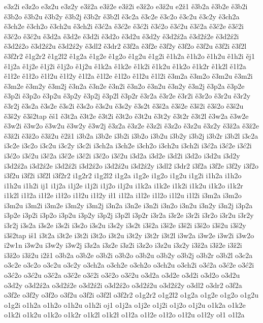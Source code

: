 {e3z2i
e3z2o
e3z2u
e3z2y
e3ž2a
e3ž2e
e3ž2i
e3ž2o
e3ž2u
e2ž1                       
ě3b2a 
ě3b2e 
ě3b2i 
ě3b2o
ě3b2u
ě3b2y
ě3b2j
ě3b2r
ě3b2l
ě3c2a
ě3c2e
ě3c2o
ě3c2u
ě3c2y
ě3ch2a
ě3ch2e
ě3ch2o
ě3ch2u
ě3ch2i
ě3ć2a
ě3ć2e
ě3ć2i
ě3ć2o
ě3ć2u
ě3č2a
ě3č2e
ě3č2i
ě3č2o
ě3č2u
ě3d2a
ě3d2e
ě3d2i
ě3d2o
ě3d2u
ě3d2y
ě3d2ź2a
ě3d2ź2e
ě3d2ź2i
ě3d2ź2o
ě3d2ź2u
ě3d2ź2y
ě3dl2
ě3dr2
ě3f2a
ě3f2e
ě3f2y
ě3f2o
ě3f2u
ě3f2i
ě3f2l
ě3f2r2
ě1g2r2
ě1g2l2
ě1g2a
ě1g2e
ě1g2o
ě1g2u
ě1g2i
ě1h2a
ě1h2o
ě1h2u
ě1h2i
ěj1
ě1j2a
ě1j2e
ě1j2i
ě1j2o
ě1j2u
ě1k2a
ě1k2e
ě1k2i
ě1k2u
ě1k2o
ě1k2r
ě1k2l
ě1ł2a
ě1ł2e
ě1ł2o
ě1ł2u
ě1ł2y
ě1l2a
ě1l2e
ě1l2o
ě1l2u
ě1l2i
ě3m2a
ě3m2o
ě3m2u
ě3m2i
ě3m2e
ě3m2y
ě3m2j
ě3n2a
ě3n2e
ě3n2i
ě3n2o
ě3n2u
ě3n2y
ě3n2j
ě3p2a
ě3p2e
ě3p2i
ě3p2o
ě3p2u
ě3p2y
ě3p2j
ě3p2l
ě3p2r
ě3r2a
ě3r2e
ě3r2i
ě3r2o
ě3r2u
ě3r2y
ě3r2j
ě3s2a
ě3s2e
ě3s2i
ě3s2o
ě3s2u
ě3s2y
ě3s2t
ě3š2a
ě3š2e
ě3š2i
ě3š2o
ě3š2u
ě3š2y
ě3š2tap
ěš1
ě3t2a
ě3t2e
ě3t2i
ě3t2o
ě3t2u
ě3t2y
ě3t2r
ě3t2l
ě3w2a
ě3w2e
ě3w2i
ě3w2o
ě3w2u
ě3w2y
ě3w2j
ě3z2a
ě3z2e
ě3z2i
ě3z2o
ě3z2u
ě3z2y
ě3ž2a
ě3ž2e
ě3ž2i
ě3ž2o
ě3ž2u
ě2ž1                       
i3b2a 
i3b2e 
i3b2i 
i3b2o
i3b2u
i3b2y
i3b2j
i3b2r
i3b2l
i3c2a
i3c2e
i3c2o
i3c2u
i3c2y
i3c2i
i3ch2a
i3ch2e
i3ch2o
i3ch2u
i3ch2i
i3ć2a
i3ć2e
i3ć2i
i3ć2o
i3ć2u
i3č2a
i3č2e
i3č2i
i3č2o
i3č2u
i3d2a
i3d2e
i3d2i
i3d2o
i3d2u
i3d2y
i3d2ź2a
i3d2ź2e
i3d2ź2i
i3d2ź2o
i3d2ź2u
i3d2ź2y
i3dl2
i3dr2
i3f2a
i3f2e
i3f2y
i3f2o
i3f2u
i3f2i
i3f2l
i3f2r2
i1g2r2
i1g2l2
i1g2a
i1g2e
i1g2o
i1g2u
i1g2i
i1h2a
i1h2o
i1h2u
i1h2i
ij1
i1j2a
i1j2e
i1j2i
i1j2o
i1j2u
i1k2a
i1k2e
i1k2i
i1k2u
i1k2o
i1k2r
i1k2l
i1ł2a
i1ł2e
i1ł2o
i1ł2u
i1ł2y
ił1
i1l2a
i1l2e
i1l2o
i1l2u
i1l2i
i3m2a
i3m2o
i3m2u
i3m2i
i3m2e
i3m2y
i3m2j
i3n2a
i3n2e
i3n2i
i3n2o
i3n2u
i3n2y
i3n2j
i3p2a
i3p2e
i3p2i
i3p2o
i3p2u
i3p2y
i3p2j
i3p2l
i3p2r
i3r2a
i3r2e
i3r2i
i3r2o
i3r2u
i3r2y
i3r2j
i3s2a
i3s2e
i3s2i
i3s2o
i3s2u
i3s2y
i3s2t
i3š2a
i3š2e
i3š2i
i3š2o
i3š2u
i3š2y
i3š2tap
iš1
i3t2a
i3t2e
i3t2i
i3t2o
i3t2u
i3t2y
i3t2r
i3t2l
i3w2a
i3w2e
i3w2i
i3w2o
i2w1n
i3w2u
i3w2y
i3w2j
i3z2a
i3z2e
i3z2i
i3z2o
i3z2u
i3z2y
i3ž2a
i3ž2e
i3ž2i
i3ž2o
i3ž2u
i2ž1                       
o3b2a 
o3b2e 
o3b2i 
o3b2o
o3b2u
o3b2y
o3b2j
o3b2r
o3b2l
o3c2a
o3c2e
o3c2o
o3c2u
o3c2y
o3ch2a
o3ch2e
o3ch2o
o3ch2u
o3ch2i
o3ć2a
o3ć2e
o3ć2i
o3ć2o
o3ć2u
o3č2a
o3č2e
o3č2i
o3č2o
o3č2u
o3d2a
o3d2e
o3d2i
o3d2o
o3d2u
o3d2y
o3d2ź2a
o3d2ź2e
o3d2ź2i
o3d2ź2o
o3d2ź2u
o3d2ź2y
o3dl2
o3dr2
o3f2a
o3f2e
o3f2y
o3f2o
o3f2u
o3f2i
o3f2l
o3f2r2
o1g2r2
o1g2l2
o1g2a
o1g2e
o1g2o
o1g2u
o1g2i
o1h2a
o1h2o
o1h2u
o1h2i
oj1
o1j2a
o1j2e
o1j2i
o1j2o
o1j2u
o1k2a
o1k2e
o1k2i
o1k2u
o1k2o
o1k2r
o1k2l
o1k2ł
o1ł2a
o1ł2e
o1ł2o
o1ł2u
o1ł2y
oł1
o1l2a
}
